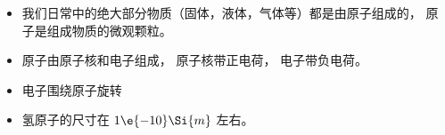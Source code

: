 
\begin{issues}
\issueDraft
\end{issues}

\begin{itemize}
\item 我们日常中的绝大部分物质（固体，液体，气体等）都是由原子组成的， 原子是组成物质的微观颗粒。
\item 原子由原子核和电子组成， 原子核带正电荷， 电子带负电荷。
\item 电子围绕原子旋转
\item 氢原子的尺寸在 $1\e{-10}\Si{m}$ 左右。
\end{itemize}
